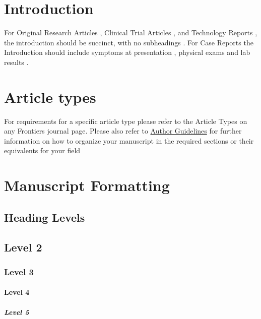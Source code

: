 \documentclass[utf8]{frontiersSCNS} %
\begin{document}
\section{Introduction}

For Original Research Articles \citep{conference}, Clinical Trial Articles \citep{article}, and Technology Reports \citep{patent}, the introduction should be succinct, with no subheadings \citep{book}. For Case Reports the Introduction should include symptoms at presentation \citep{chapter}, physical exams and lab results \citep{dataset}.



\section{Article types}

For requirements for a specific article type please refer to the Article Types on any Frontiers journal page. Please also refer to  \href{http://home.frontiersin.org/about/author-guidelines#Sections}{Author Guidelines} for further information on how to organize your manuscript in the required sections or their equivalents for your field


\section{Manuscript Formatting}

\subsection{Heading Levels}


\subsection{Level 2}
\subsubsection{Level 3}
\paragraph{Level 4}
\subparagraph{Level 5}
\end{document}
